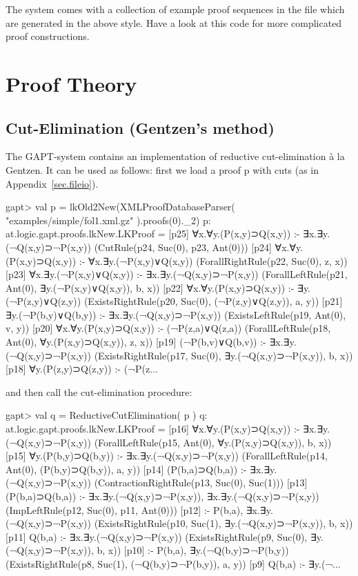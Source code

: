 \documentclass[a4paper,11pt]{article}
\newcommand{\cli}[1]{{\ttfamily {#1}}}
\begin{document}
The system comes with a collection of example proof sequences in the file
\cli{examples/ProofSequences.scala} which are generated in the above style.
Have a look at this code for more complicated proof constructions.

\section{Proof Theory}

\subsection{Cut-Elimination (Gentzen's method)}

The GAPT-system contains an implementation of reductive cut-elimination
\`{a} la Gentzen. It can be used as follows: first we load a proof p
with cuts (as in Appendix~\ref{sec.fileio}).
%
\begin{clilisting}
gapt> val p = lkOld2New(XMLProofDatabaseParser( "examples/simple/fol1.xml.gz" ).proofs(0)._2)
p: at.logic.gapt.proofs.lkNew.LKProof =
[p25] ∀x.∀y.(P(x,y)⊃Q(x,y)) :- ∃x.∃y.(¬Q(x,y)⊃¬P(x,y))    (CutRule(p24, Suc(0), p23, Ant(0)))
[p24] ∀x.∀y.(P(x,y)⊃Q(x,y)) :- ∀x.∃y.(¬P(x,y)∨Q(x,y))    (ForallRightRule(p22, Suc(0), z, x))
[p23] ∀x.∃y.(¬P(x,y)∨Q(x,y)) :- ∃x.∃y.(¬Q(x,y)⊃¬P(x,y))    (ForallLeftRule(p21, Ant(0), ∃y.(¬P(x,y)∨Q(x,y)), b, x))
[p22] ∀x.∀y.(P(x,y)⊃Q(x,y)) :- ∃y.(¬P(z,y)∨Q(z,y))    (ExistsRightRule(p20, Suc(0), (¬P(z,y)∨Q(z,y)), a, y))
[p21] ∃y.(¬P(b,y)∨Q(b,y)) :- ∃x.∃y.(¬Q(x,y)⊃¬P(x,y))    (ExistsLeftRule(p19, Ant(0), v, y))
[p20] ∀x.∀y.(P(x,y)⊃Q(x,y)) :- (¬P(z,a)∨Q(z,a))    (ForallLeftRule(p18, Ant(0), ∀y.(P(x,y)⊃Q(x,y)), z, x))
[p19] (¬P(b,v)∨Q(b,v)) :- ∃x.∃y.(¬Q(x,y)⊃¬P(x,y))    (ExistsRightRule(p17, Suc(0), ∃y.(¬Q(x,y)⊃¬P(x,y)), b, x))
[p18] ∀y.(P(z,y)⊃Q(z,y)) :- (¬P(z...
\end{clilisting}
%
and then call the cut-elimination procedure:
\begin{clilisting}
gapt> val q = ReductiveCutElimination( p )
q: at.logic.gapt.proofs.lkNew.LKProof =
[p16] ∀x.∀y.(P(x,y)⊃Q(x,y)) :- ∃x.∃y.(¬Q(x,y)⊃¬P(x,y))    (ForallLeftRule(p15, Ant(0), ∀y.(P(x,y)⊃Q(x,y)), b, x))
[p15] ∀y.(P(b,y)⊃Q(b,y)) :- ∃x.∃y.(¬Q(x,y)⊃¬P(x,y))    (ForallLeftRule(p14, Ant(0), (P(b,y)⊃Q(b,y)), a, y))
[p14] (P(b,a)⊃Q(b,a)) :- ∃x.∃y.(¬Q(x,y)⊃¬P(x,y))    (ContractionRightRule(p13, Suc(0), Suc(1)))
[p13] (P(b,a)⊃Q(b,a)) :- ∃x.∃y.(¬Q(x,y)⊃¬P(x,y)), ∃x.∃y.(¬Q(x,y)⊃¬P(x,y))    (ImpLeftRule(p12, Suc(0), p11, Ant(0)))
[p12]  :- P(b,a), ∃x.∃y.(¬Q(x,y)⊃¬P(x,y))    (ExistsRightRule(p10, Suc(1), ∃y.(¬Q(x,y)⊃¬P(x,y)), b, x))
[p11] Q(b,a) :- ∃x.∃y.(¬Q(x,y)⊃¬P(x,y))    (ExistsRightRule(p9, Suc(0), ∃y.(¬Q(x,y)⊃¬P(x,y)), b, x))
[p10]  :- P(b,a), ∃y.(¬Q(b,y)⊃¬P(b,y))    (ExistsRightRule(p8, Suc(1), (¬Q(b,y)⊃¬P(b,y)), a, y))
[p9] Q(b,a) :- ∃y.(¬...
\end{clilisting}
\end{document}
